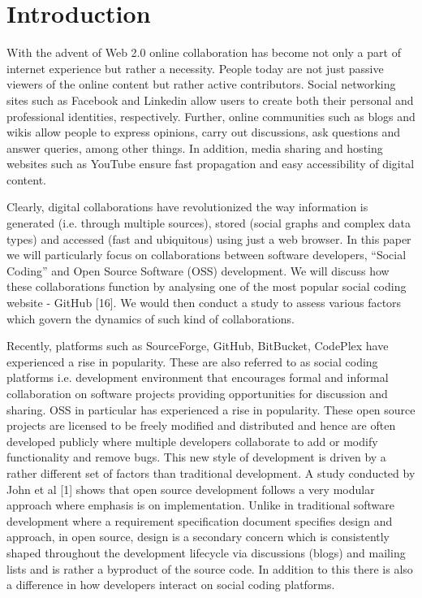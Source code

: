
\section{Introduction}
\label{sec:introduction}

With the advent of Web 2.0 online collaboration has become not only a part of internet experience but rather a necessity. People today are not just passive viewers of the online content but rather active contributors. Social networking sites such as Facebook and Linkedin allow users to create both their personal and professional identities, respectively. Further, online communities such as blogs and wikis allow people to express opinions, carry out discussions, ask questions and answer queries, among other things. In addition, media sharing and hosting websites such as YouTube ensure fast propagation and easy accessibility of digital content.

Clearly, digital collaborations have revolutionized the way information is generated (i.e. through multiple sources), stored (social graphs and complex data types) and accessed (fast and ubiquitous) using just a web browser. In this paper we will particularly focus on collaborations between software developers, ``Social Coding'' and Open Source Software (OSS) development. We will discuss how these collaborations function by analysing one of the most popular social coding website - GitHub [16]. We would then conduct a study to assess various factors which govern the dynamics of such kind of collaborations.

Recently, platforms such as SourceForge, GitHub, BitBucket, CodePlex have experienced a rise in popularity. These are also referred to as social coding platforms i.e. development environment that encourages formal and informal collaboration on software projects providing opportunities for discussion and sharing. OSS in particular has experienced a rise in popularity. These open source projects are licensed to be freely modified and distributed and hence are often developed publicly where multiple developers collaborate to add or modify functionality and remove bugs. This new style of development is driven by a rather different set of factors than traditional development. A study conducted by John et al [1] shows that open source development follows a very modular approach where emphasis is on implementation. Unlike in traditional software development where a requirement specification document specifies design and approach, in open source, design is a secondary concern which is consistently shaped throughout the development lifecycle via discussions (blogs) and mailing lists and is rather a byproduct of the source code. In addition to this there is also a difference in how developers interact on social coding platforms.

